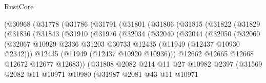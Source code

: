 \begin{lexlean}{RustCore}
\begin{coremodule}
                (@30968
                  (@31778
                    (@31786
                      (@31791
                        (@31801
                          (@31806
                            (@31815
                              (@31822
                                (@31829
                                  (@31836
                                    (@31843
                                      (@31910
                                        (@31976
                                          (@32034
                                            (@32040
                                              (@32044
                                                (@32050
                                                  (@32060
                                                    (@32067
                                                      @10929
                                                      @2336
                                                      @31203
                                                      @30733
                                                      @12435
                                                      (@11949 (@12437 @10930 @2342)))
                                                    @12435
                                                    (@11949 (@12437 @10920 @10936)))
                                                  @12662
                                                  @12665
                                                  @12668
                                                  @12672
                                                  @12677
                                                  @12683))
                                              (@31808
                                                @2082
                                                @214
                                                @11
                                                @27
                                                @10982
                                                @2397
                                                (@31569
                                                  @2082
                                                  @11
                                                  @10971
                                                  @10980
                                                  (@31987
                                                    @2081
                                                    @43
                                                    @11
                                                    @10971

\end{coremodule}
\end{lexlean}
